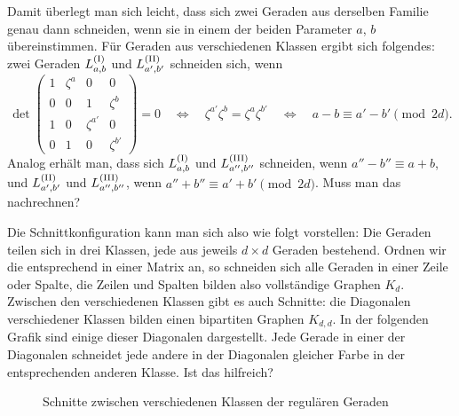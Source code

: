 Damit überlegt man sich leicht, dass sich zwei Geraden aus derselben Familie genau dann schneiden, wenn sie in einem der beiden Parameter $a$, $b$ übereinstimmen. Für Geraden aus verschiedenen Klassen ergibt sich folgendes: zwei Geraden $\Lcl(I)_{a,b}$ und $\Lcl(II)_{a',b'}$ schneiden sich, wenn
\begin{equation}
\det \begin{pmatrix}
1 & \zeta^a & 0 & 0 \\
0 & 0 & 1 & \zeta^b \\
1 & 0 & \zeta^{a'} & 0 \\
0 & 1 & 0 & \zeta^{b'}
\end{pmatrix} = 0 \quad\Longleftrightarrow\quad \zeta^{a'} \zeta^b = \zeta^a \zeta^{b'} \quad\Leftrightarrow\quad a-b \equiv a'-b' \pmod{2d}.
\end{equation}
Analog erhält man, dass sich $\Lcl(I)_{a,b}$ und $\Lcl(III)_{a'',b''}$ schneiden, wenn $a''-b'' \equiv a+b$, und $\Lcl(II)_{a',b'}$ und $\Lcl(III)_{a'',b''}$, wenn $a''+b'' \equiv a'+b' \pmod{2d}$. \note Muss man das nachrechnen?

Die Schnittkonfiguration kann man sich also wie folgt vorstellen: Die Geraden teilen sich in drei Klassen, jede aus jeweils $d \times d$ Geraden bestehend. Ordnen wir die entsprechend in einer Matrix an, so schneiden sich alle Geraden in einer Zeile oder Spalte, die Zeilen und Spalten bilden also vollständige Graphen $K_d$. Zwischen den verschiedenen Klassen gibt es auch Schnitte: die Diagonalen verschiedener Klassen bilden einen bipartiten Graphen $K_{d,d}$. In der folgenden Grafik sind einige dieser Diagonalen dargestellt. Jede Gerade in einer der Diagonalen schneidet jede andere in der Diagonalen gleicher Farbe in der entsprechenden anderen Klasse. \note Ist das hilfreich?

\begin{figure}[h]
\centering
{}
\caption{Schnitte zwischen verschiedenen Klassen der regulären Geraden}\label{fig:reg}
\end{figure}

